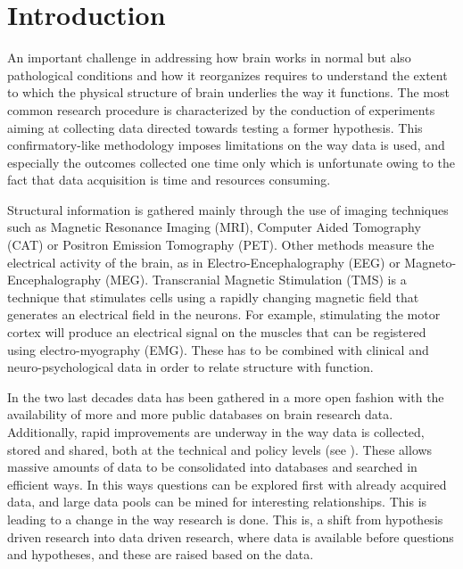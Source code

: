 \documentclass[utf8,paper]{frontiersSCNS} %
\begin{document}




\section{Introduction}

An important challenge in addressing how brain works in normal but also pathological conditions and how it reorganizes  requires to understand the extent to which the physical structure of brain underlies the way it functions. The most common research procedure is characterized by the conduction of experiments aiming at collecting data directed towards testing a former hypothesis. This  confirmatory-like methodology imposes limitations on the way data is used, and especially the outcomes collected one time only which is unfortunate owing to the fact that data acquisition is time and resources consuming.

Structural information is gathered mainly through the use of imaging techniques such as Magnetic Resonance Imaging (MRI), Computer Aided Tomography (CAT) or Positron Emission Tomography (PET). Other methods measure the electrical activity of the brain, as in Electro-Encephalography (EEG) or Magneto-Encephalography (MEG). Transcranial Magnetic Stimulation (TMS) is a technique that stimulates cells using a rapidly changing magnetic field that generates an electrical field in the neurons. For example, stimulating the motor cortex will produce an electrical signal on the muscles that can be registered using electro-myography (EMG). These has to be combined with clinical and neuro-psychological data in order to relate structure with function.
										
In the two last decades data has been gathered in a more open fashion with the availability of more and more public databases on brain research data. Additionally, rapid improvements are underway in the way data is collected, stored and shared, both at the technical and policy levels (see \cite{eckersley_neuroscience_2003}). These allows massive amounts of data to be consolidated into databases and searched in efficient ways. In this ways questions can be explored first with already acquired data, and large data pools can be mined for interesting relationships. This is leading to a change in the way research is done. This is, a shift from hypothesis driven research into data driven research, where data is available before questions and hypotheses, and these are raised based on the data.
				
\end{document}
